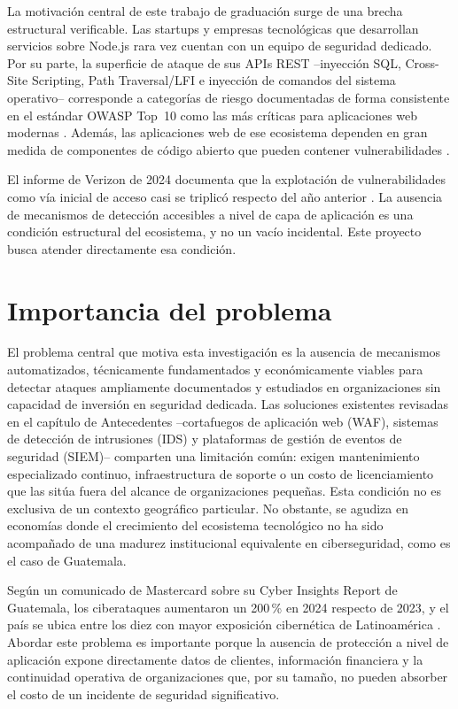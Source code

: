 La motivación central de este trabajo de graduación surge de una brecha estructural verificable. Las startups y empresas tecnológicas que desarrollan servicios sobre Node.js rara vez cuentan con un equipo de seguridad dedicado. Por su parte, la superficie de ataque de sus APIs REST --inyección SQL, Cross-Site Scripting, Path Traversal/LFI e inyección de comandos del sistema operativo-- corresponde a categorías de riesgo documentadas de forma consistente en el estándar OWASP Top~10 como las más críticas para aplicaciones web modernas \parencite{owasp2021}. Además, las aplicaciones web de ese ecosistema dependen en gran medida de componentes de código abierto que pueden contener vulnerabilidades \parencite{snyk2024}.

El informe de Verizon de 2024 documenta que la explotación de vulnerabilidades como vía inicial de acceso casi se triplicó respecto del año anterior \parencite{verizon2024}. La ausencia de mecanismos de detección accesibles a nivel de capa de aplicación es una condición estructural del ecosistema, y no un vacío incidental. Este proyecto busca atender directamente esa condición.

\section{Importancia del problema}

El problema central que motiva esta investigación es la ausencia de mecanismos automatizados, técnicamente fundamentados y económicamente viables para detectar ataques ampliamente documentados y estudiados en organizaciones sin capacidad de inversión en seguridad dedicada. Las soluciones existentes revisadas en el capítulo de Antecedentes --cortafuegos de aplicación web (WAF), sistemas de detección de intrusiones (IDS) y plataformas de gestión de eventos de seguridad (SIEM)-- comparten una limitación común: exigen mantenimiento especializado continuo, infraestructura de soporte o un costo de licenciamiento que las sitúa fuera del alcance de organizaciones pequeñas. Esta condición no es exclusiva de un contexto geográfico particular. No obstante, se agudiza en economías donde el crecimiento del ecosistema tecnológico no ha sido acompañado de una madurez institucional equivalente en ciberseguridad, como es el caso de Guatemala.

Según un comunicado de Mastercard sobre su Cyber Insights Report de Guatemala, los ciberataques aumentaron un 200\,\% en 2024 respecto de 2023, y el país se ubica entre los diez con mayor exposición cibernética de Latinoamérica \parencite{mastercard2025}. Abordar este problema es importante porque la ausencia de protección a nivel de aplicación expone directamente datos de clientes, información financiera y la continuidad operativa de organizaciones que, por su tamaño, no pueden absorber el costo de un incidente de seguridad significativo.

